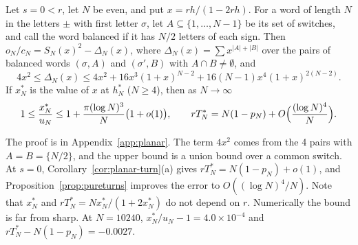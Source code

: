 \begin{proposition}\label{prop:pureturns}
Let $s=0<r$, let $N$ be even, and put $x=rh/(1-2rh)$. For a word of length $N$ in the letters $\pm$
with first letter $\sigma$, let $A\subseteq\{1,\dots,N-1\}$ be its set of switches, and call the word
balanced if it has $N/2$ letters of each sign. Then $o_N/c_N=S_N(x)^2-\Delta_N(x)$, where
$\Delta_N(x)=\sum x^{\lvert A\rvert+\lvert B\rvert}$ over the pairs of balanced words $(\sigma,A)$ and
$(\sigma',B)$ with $A\cap B\ne\emptyset$, and
\[
 4x^2\le\Delta_N(x)\le4x^2+16x^3(1+x)^{N-2}+16(N-1)x^4(1+x)^{2(N-2)}.
\]
If $x^*_N$ is the value of $x$ at $h^*_N$ \textup{(}$N\ge4$\textup{)}, then as $N\to\infty$
\[
 1\le\frac{x^*_N}{u_N}\le1+\frac{\pi(\log N)^3}N\bigl(1+o(1)\bigr),\qquad
 rT^*_N=N(1-p_N)+O\Bigl(\frac{(\log N)^4}N\Bigr).
\]
\end{proposition}

The proof is in Appendix~\ref{app:planar}. The term $4x^2$ comes from the 4 pairs with
$A=B=\{N/2\}$, and the upper bound is a union bound over a common switch. At $s=0$,
Corollary~\ref{cor:planar-turn}(a) gives $rT^*_N=N(1-p_N)+o(1)$, and
Proposition~\ref{prop:pureturns} improves the error to $O((\log N)^4/N)$. Note that $x^*_N$ and
$rT^*_N=Nx^*_N/(1+2x^*_N)$ do not depend on $r$. Numerically the bound is far from sharp. At
$N=10240$, $x^*_N/u_N-1=4.0\times10^{-4}$ and $rT^*_N-N(1-p_N)=-0.0027$.
